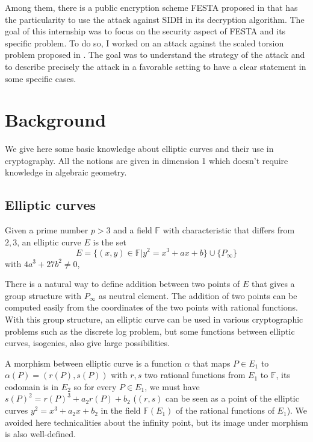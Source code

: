 \documentclass[12pt,a4paper]{article}
\begin{document}
	Among them, there is a public encryption scheme FESTA proposed in \cite{FESTA} that has the
	particularity to use the attack against SIDH in its decryption algorithm.
	The goal of this internship
	was to focus on the security aspect of FESTA and its specific problem. To do so, I worked on an attack
	against the scaled torsion problem proposed in \cite{polyCIST}. The goal was to understand the strategy
	of the attack and to describe precisely the attack in a favorable setting to have a clear statement in
	some specific cases.


	\section{Background}

	We give here some basic knowledge about elliptic curves and their use in cryptography. All the notions
	are given in dimension 1 which doesn't require knowledge in algebraic geometry.


	\subsection{Elliptic curves}
		Given a prime number $p>3$ and a field $\mathbb F$ with characteristic that differs from $2,3$,
		an elliptic curve $E$ is the set \[
			E = \{(x,y)\in\mathbb F | y^2=x^{3}+ax+b\} \cup \{P_\infty\}
		\] 
		with $4a^3+27b^2\neq0$,
		
		There is a natural way to define addition between two points of $E$ that gives a group structure
		with $P_\infty$ as neutral element. The addition of two points can be computed easily from the
		coordinates of the two points with rational functions. With this group structure, an elliptic curve
		can be used in various cryptographic problems such as the discrete log problem, but some functions
		between elliptic curves, isogenies, also give large possibilities.

		A morphism between elliptic curve is a function $\alpha$ that maps $P\in E_1$ to
		$\alpha(P)=(r(P),s(P))$ with  $r,s$ two rational functions from $E_1$ to $\mathbb F$, its codomain
		is in $E_2$ so for every $P\in E_1$, we must have $s(P)^2=r(P)^3+a_2r(P)+b_2$ ($(r,s)$ can be seen as
		a point of the elliptic curves $y^2=x^3+a_2x+b_2$ in the field  $\mathbb F(E_1)$ of the rational
		functions of $E_1$). We avoided here technicalities about the infinity point, but its image under
		morphism is also well-defined.
		
\end{document}
